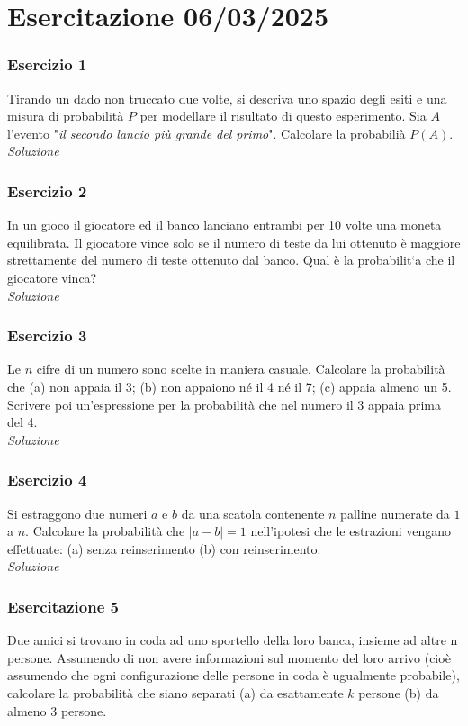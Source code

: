 \section{Esercitazione 06/03/2025}
\subsubsection{Esercizio 1}
Tirando un dado non truccato due volte, si descriva uno spazio degli esiti e una misura di probabilità $P$ per modellare il risultato di questo esperimento. Sia $A$ l’evento "\textit{il secondo lancio più grande del primo}". Calcolare la probabilià $P(A)$.
\\

\textit{Soluzione} \quad 

\subsubsection{Esercizio 2}
In un gioco il giocatore ed il banco lanciano entrambi per 10 volte una moneta equilibrata. Il giocatore vince solo se il numero di teste da lui ottenuto è maggiore strettamente del numero di teste ottenuto dal banco. Qual è la probabilit`a che il giocatore vinca?
\\

\textit{Soluzione} \quad 

\subsubsection{Esercizio 3}
Le $n$ cifre di un numero sono scelte in maniera casuale. Calcolare la probabilità che
(a) non appaia il 3;
(b) non appaiono né il 4 né il 7; (c) appaia almeno un 5.
Scrivere poi un’espressione per la probabilità che nel numero il 3 appaia prima del 4.
\\

\textit{Soluzione} \quad 

\subsubsection{Esercizio 4} Si estraggono due numeri $a$ e $b$ da una scatola contenente $n$ palline numerate da $1$ a $n$. Calcolare la probabilità che $|a-b| = 1$ nell’ipotesi che le estrazioni vengano effettuate:
(a) senza reinserimento (b) con reinserimento.
\\

\textit{Soluzione} \quad 

\subsubsection{Esercitazione 5} Due amici si trovano in coda ad uno sportello della loro banca, insieme ad altre n persone. Assumendo di non avere informazioni sul momento del loro arrivo (cioè assumendo che ogni configurazione delle persone in coda è ugualmente probabile), calcolare la probabilità che siano separati
(a) da esattamente $k$ persone (b) da almeno 3 persone.
\\

